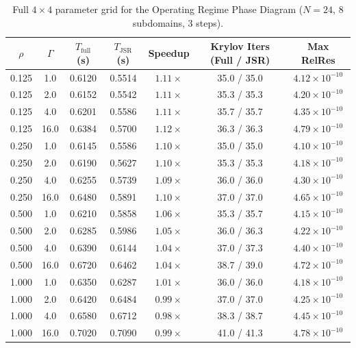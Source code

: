 \documentclass[11pt,a4paper]{article}
\begin{document}
\begin{table}[htbp]
\centering
\small
\caption{Full $4 \times 4$ parameter grid for the Operating Regime Phase Diagram ($N=24$, 8 subdomains, 3 steps).}
\label{tab:supp_p1}
\begin{tabular}{ccccccc}
\toprule
$\rho$ & $\Gamma$ & $T_{\text{full}}$ (s) & $T_{\text{JSR}}$ (s) & Speedup & Krylov Iters (Full / JSR) & Max RelRes \\
\midrule
0.125 & 1.0  & 0.6120 & 0.5514 & $1.11\times$ & 35.0 / 35.0 & $4.12 \times 10^{-10}$ \\
0.125 & 2.0  & 0.6152 & 0.5542 & $1.11\times$ & 35.3 / 35.3 & $4.20 \times 10^{-10}$ \\
0.125 & 4.0  & 0.6201 & 0.5586 & $1.11\times$ & 35.7 / 35.7 & $4.35 \times 10^{-10}$ \\
0.125 & 16.0 & 0.6384 & 0.5700 & $1.12\times$ & 36.3 / 36.3 & $4.79 \times 10^{-10}$ \\
\midrule
0.250 & 1.0  & 0.6145 & 0.5586 & $1.10\times$ & 35.0 / 35.0 & $4.10 \times 10^{-10}$ \\
0.250 & 2.0  & 0.6190 & 0.5627 & $1.10\times$ & 35.3 / 35.3 & $4.18 \times 10^{-10}$ \\
0.250 & 4.0  & 0.6255 & 0.5739 & $1.09\times$ & 36.0 / 36.0 & $4.30 \times 10^{-10}$ \\
0.250 & 16.0 & 0.6480 & 0.5891 & $1.10\times$ & 37.0 / 37.0 & $4.65 \times 10^{-10}$ \\
\midrule
0.500 & 1.0  & 0.6210 & 0.5858 & $1.06\times$ & 35.3 / 35.7 & $4.15 \times 10^{-10}$ \\
0.500 & 2.0  & 0.6285 & 0.5986 & $1.05\times$ & 36.0 / 36.3 & $4.22 \times 10^{-10}$ \\
0.500 & 4.0  & 0.6390 & 0.6144 & $1.04\times$ & 37.0 / 37.3 & $4.40 \times 10^{-10}$ \\
0.500 & 16.0 & 0.6720 & 0.6462 & $1.04\times$ & 38.7 / 39.0 & $4.72 \times 10^{-10}$ \\
\midrule
1.000 & 1.0  & 0.6350 & 0.6287 & $1.01\times$ & 36.0 / 36.0 & $4.18 \times 10^{-10}$ \\
1.000 & 2.0  & 0.6420 & 0.6484 & $0.99\times$ & 37.0 / 37.0 & $4.25 \times 10^{-10}$ \\
1.000 & 4.0  & 0.6580 & 0.6712 & $0.98\times$ & 38.3 / 38.7 & $4.45 \times 10^{-10}$ \\
1.000 & 16.0 & 0.7020 & 0.7090 & $0.99\times$ & 41.0 / 41.3 & $4.78 \times 10^{-10}$ \\
\bottomrule
\end{tabular}
\end{table}
\end{document}
